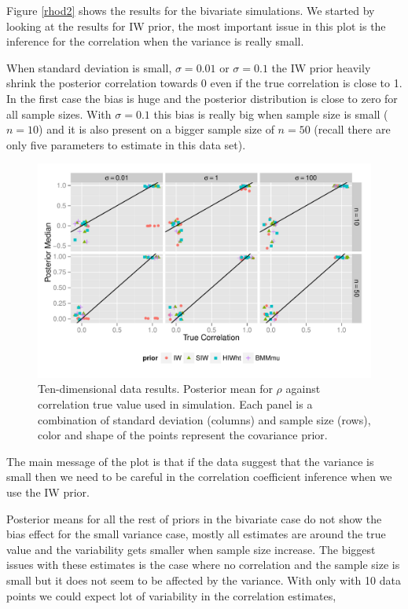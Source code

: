 \documentclass{article}
\begin{document}
Figure \ref{rhod2} shows the results for the bivariate simulations.  We started by looking at the results for IW prior, the most important issue in this plot is the inference for the correlation when the variance is really small. 

When standard deviation is small, $\sigma=0.01$ or $\sigma=0.1$ the IW prior heavily shrink the posterior correlation towards 0 even if the true correlation is close to 1. In the first case the bias is huge and the posterior distribution is close to zero for all sample sizes.  With $\sigma=0.1$ this bias is really big when sample size is small ($n=10$) and it is also present on a bigger sample size of $n=50$ (recall there are only five parameters to estimate in this data set). 
\begin{figure}[hbpt]
   \centering
   \includegraphics[width=\textwidth]{fig_rho_d10} %
    \vspace{-.5in}
   \caption{ Ten-dimensional data results. Posterior mean for $\rho$  against correlation true value used in simulation. Each panel is a combination of standard deviation (columns) and sample size (rows),  color and shape of the points represent the covariance prior. \label{rhod10} }
\end{figure}

The main message of the plot is that if the data suggest that the variance is small then we need to be careful in the correlation coefficient inference when we use the IW prior. 

Posterior means for all the rest of priors in the bivariate case  do not show the bias effect for the small variance case, mostly all estimates are around the true value and the variability gets smaller when sample size increase.  The biggest issues with these estimates is the case where no correlation and the sample size is small but it does not seem to be affected by the variance.  With only with 10 data points we could expect lot of variability in the correlation estimates,
\end{document}
